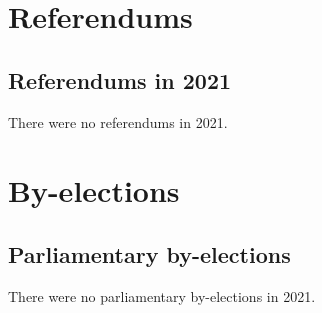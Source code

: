 \documentclass[a4paper,openany]{book}
\begin{document}
 
 



\part{Referendums}

\chapter{Referendums in 2021}

There were no referendums in 2021.

%
%

\part{By-elections}

\chapter{Parliamentary by-elections}

There were no parliamentary by-elections in 2021.
\end{document}
